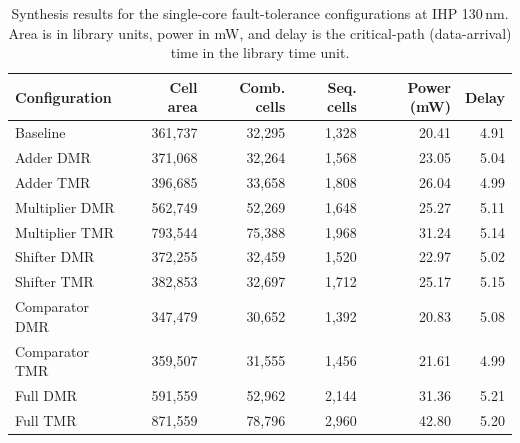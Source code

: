 \begin{table}[htbp]
\centering
\caption{Synthesis results for the single-core fault-tolerance configurations at IHP 130\,nm. Area is in library units, power in mW, and delay is the critical-path (data-arrival) time in the library time unit.}
\label{tab:abs_130nm}
\small
\begin{tabular}{lrrrrr}
\toprule
Configuration & Cell area & Comb. cells & Seq. cells & Power (mW) & Delay \\
\midrule
Baseline & 361,737 & 32,295 & 1,328 & 20.41 & 4.91 \\
Adder DMR & 371,068 & 32,264 & 1,568 & 23.05 & 5.04 \\
Adder TMR & 396,685 & 33,658 & 1,808 & 26.04 & 4.99 \\
Multiplier DMR & 562,749 & 52,269 & 1,648 & 25.27 & 5.11 \\
Multiplier TMR & 793,544 & 75,388 & 1,968 & 31.24 & 5.14 \\
Shifter DMR & 372,255 & 32,459 & 1,520 & 22.97 & 5.02 \\
Shifter TMR & 382,853 & 32,697 & 1,712 & 25.17 & 5.15 \\
Comparator DMR & 347,479 & 30,652 & 1,392 & 20.83 & 5.08 \\
Comparator TMR & 359,507 & 31,555 & 1,456 & 21.61 & 4.99 \\
Full DMR & 591,559 & 52,962 & 2,144 & 31.36 & 5.21 \\
Full TMR & 871,559 & 78,796 & 2,960 & 42.80 & 5.20 \\
\bottomrule
\end{tabular}
\end{table}
